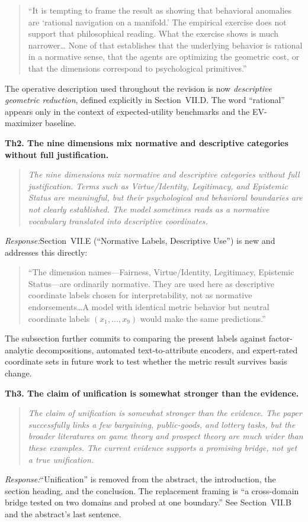 \documentclass[11pt]{article}
\newcommand{\rev}[1]{\textbf{#1}}
\newcommand{\resp}{\medskip\noindent\emph{Response:}\quad}
\begin{document}
\begin{quote}\small
``It is tempting to frame the result as showing that behavioral anomalies are `rational navigation on a manifold.' The empirical exercise does not support that philosophical reading. What the exercise shows is much narrower\ldots
None of that establishes that the underlying behavior is rational in a normative sense,
that the agents are optimizing the geometric cost, or that the dimensions correspond to
psychological primitives.''
\end{quote}

The operative description used throughout the revision is now \emph{descriptive geometric
reduction}, defined explicitly in Section~VII.D. The word ``rational'' appears only in the
context of expected-utility benchmarks and the EV-maximizer baseline.

\rev{Th2. The nine dimensions mix normative and descriptive categories without full justification.}
\begin{quote}\itshape\small
The nine dimensions mix normative and descriptive categories without full justification. Terms such as Virtue/Identity, Legitimacy, and Epistemic Status are meaningful, but their psychological and behavioral boundaries are not clearly established. The model sometimes reads as a normative vocabulary translated into descriptive coordinates.
\end{quote}
\resp Section~VII.E (``Normative Labels, Descriptive Use'') is new and addresses this
directly:

\begin{quote}\small
``The dimension names---Fairness, Virtue/Identity, Legitimacy, Epistemic Status---are
ordinarily normative. They are used here as descriptive coordinate labels chosen for
interpretability, not as normative endorsements\ldots A model with identical metric
behavior but neutral coordinate labels $(x_1,\ldots,x_9)$ would make the same
predictions.''
\end{quote}

The subsection further commits to comparing the present labels against factor-analytic
decompositions, automated text-to-attribute encoders, and expert-rated coordinate sets in
future work to test whether the metric result survives basis change.

\rev{Th3. The claim of unification is somewhat stronger than the evidence.}
\begin{quote}\itshape\small
The claim of unification is somewhat stronger than the evidence. The paper successfully links a few bargaining, public-goods, and lottery tasks, but the broader literatures on game theory and prospect theory are much wider than these examples. The current evidence supports a promising bridge, not yet a true unification.
\end{quote}
\resp ``Unification'' is removed from the abstract, the introduction, the section heading,
and the conclusion. The replacement framing is ``a cross-domain bridge tested on two
domains and probed at one boundary.'' See Section~VII.B and the abstract's last sentence.
\end{document}
